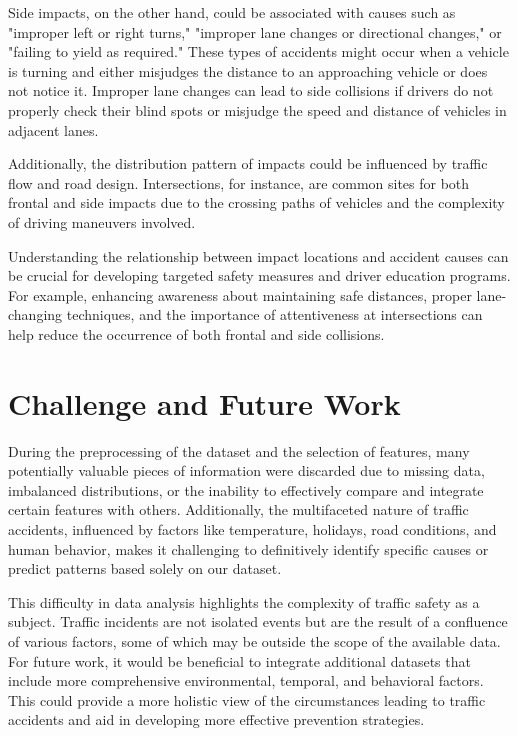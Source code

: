 \documentclass[a4paper, oneside, final, 12pt]{scrartcl} %
\begin{document}
Side impacts, on the other hand, 
could be associated with causes such as "improper left or right turns," 
"improper lane changes or directional changes," or "failing to yield as required." 
These types of accidents might occur when a vehicle is turning and either 
misjudges the distance to an approaching vehicle or does not notice it. 
Improper lane changes can lead to side collisions if drivers do not properly 
check their blind spots or misjudge the speed and distance of vehicles in adjacent lanes.

Additionally, the distribution pattern of impacts could be influenced 
by traffic flow and road design. Intersections, for instance, 
are common sites for both frontal and side impacts due to the crossing 
paths of vehicles and the complexity of driving maneuvers involved.

Understanding the relationship between impact locations and 
accident causes can be crucial for developing targeted safety 
measures and driver education programs. For example, 
enhancing awareness about maintaining safe distances, 
proper lane-changing techniques, and the importance of attentiveness 
at intersections can help reduce the occurrence of both frontal and side collisions.

\section{Challenge and Future Work}

During the preprocessing of the dataset and the selection of features, 
many potentially valuable pieces of information were discarded due to missing data, 
imbalanced distributions, or the inability to effectively compare and 
integrate certain features with others. Additionally, 
the multifaceted nature of traffic accidents, 
influenced by factors like temperature, holidays, road conditions, 
and human behavior, makes it challenging to definitively identify specific 
causes or predict patterns based solely on our dataset.

This difficulty in data analysis highlights the complexity of traffic safety as a subject. 
Traffic incidents are not isolated events but are the result of a 
confluence of various factors, some of which may be outside the scope of the available data. 
For future work, it would be beneficial to integrate additional datasets 
that include more comprehensive environmental, temporal, and behavioral factors. 
This could provide a more holistic view of the circumstances leading to 
traffic accidents and aid in developing more effective prevention strategies.
\end{document}
